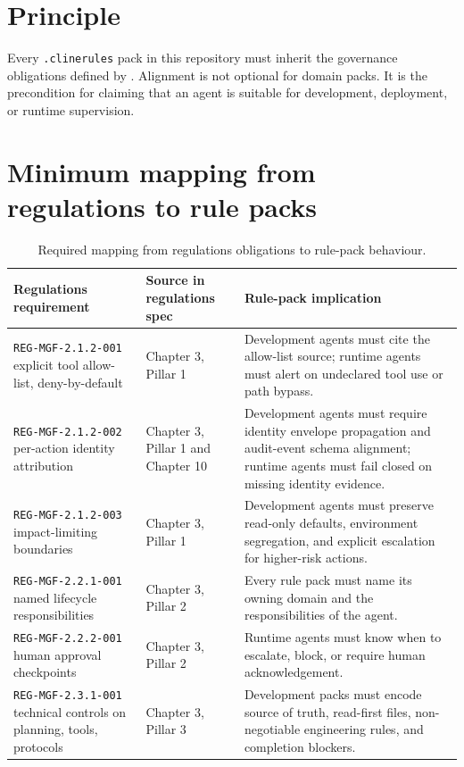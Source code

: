 \documentclass[11pt,a4paper,twoside]{report}
\newcommand{\filepath}[1]{{\color{pathcolor}\path{#1}}}
\newcommand{\artifact}[1]{\texttt{\textcolor{sapblue}{#1}}}
\newcommand{\reqid}[1]{\texttt{\textcolor{regred}{#1}}}
\begin{document}
\section{Principle}

Every \artifact{.clinerules} pack in this repository must inherit the
governance obligations defined by
\filepath{docs/pdf/specs/regulations-spec.pdf}. Alignment is not
optional for domain packs. It is the precondition for claiming that an
agent is suitable for development, deployment, or runtime supervision.

\section{Minimum mapping from regulations to rule packs}

\begin{table}[htbp]
\centering
\footnotesize
\caption{Required mapping from regulations obligations to rule-pack behaviour.}
\label{tab:reg-map}
\begin{tabularx}{\textwidth}{@{}L{3.2cm}L{3.0cm}X@{}}
\toprule
\textbf{Regulations requirement} & \textbf{Source in regulations spec} & \textbf{Rule-pack implication} \\
\midrule
\reqid{REG-MGF-2.1.2-001} explicit tool allow-list, deny-by-default & Chapter 3, Pillar 1 & Development agents must cite the allow-list source; runtime agents must alert on undeclared tool use or path bypass. \\
\reqid{REG-MGF-2.1.2-002} per-action identity attribution & Chapter 3, Pillar 1 and Chapter 10 & Development agents must require identity envelope propagation and audit-event schema alignment; runtime agents must fail closed on missing identity evidence. \\
\reqid{REG-MGF-2.1.2-003} impact-limiting boundaries & Chapter 3, Pillar 1 & Development agents must preserve read-only defaults, environment segregation, and explicit escalation for higher-risk actions. \\
\reqid{REG-MGF-2.2.1-001} named lifecycle responsibilities & Chapter 3, Pillar 2 & Every rule pack must name its owning domain and the responsibilities of the agent. \\
\reqid{REG-MGF-2.2.2-001} human approval checkpoints & Chapter 3, Pillar 2 & Runtime agents must know when to escalate, block, or require human acknowledgement. \\
\reqid{REG-MGF-2.3.1-001} technical controls on planning, tools, protocols & Chapter 3, Pillar 3 & Development packs must encode source of truth, read-first files, non-negotiable engineering rules, and completion blockers. \\

\end{tabularx}
\end{table}
\end{document}
